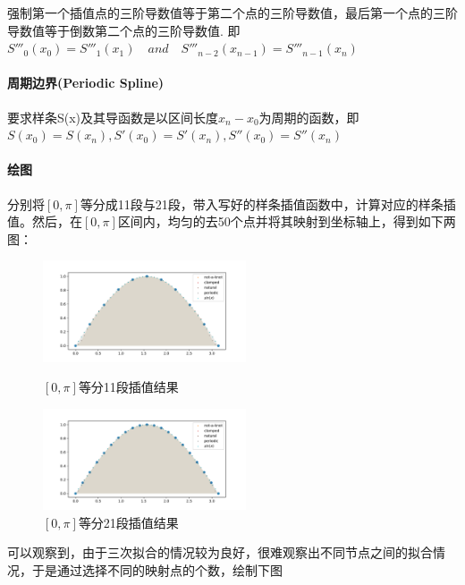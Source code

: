 强制第一个插值点的三阶导数值等于第二个点的三阶导数值，最后第一个点的三阶导数值等于倒数第二个点的三阶导数值. 即$S'''_0(x_0)=S'''_1(x_1) \quad and \quad S'''_{n-2}(x_{n-1})=S'''_{n-1}(x_n)$

\paragraph{周期边界(Periodic Spline)}

要求样条S(x)及其导函数是以区间长度$x_n-x_0$为周期的函数，即$S(x_0)=S(x_n),S'(x_0)=S'(x_n),S''(x_0)=S''(x_n)$

\paragraph{绘图}

分别将$[0,\pi]$等分成11段与21段，带入写好的样条插值函数中，计算对应的样条插值。然后，在$[0,\pi]$区间内，均匀的去50个点并将其映射到坐标轴上，得到如下两图：


\begin{figure}[H]
\centering
\begin{minipage}[t]{0.48\textwidth}
\centering
\includegraphics[width=6cm]{4-1.pdf}
\caption{$[0,\pi]$等分11段插值结果}
\end{minipage}
\begin{minipage}[t]{0.48\textwidth}
\centering
\includegraphics[width=6cm]{4-3.pdf}
\caption{$[0,\pi]$等分21段插值结果}
\end{minipage}
\end{figure}

可以观察到，由于三次拟合的情况较为良好，很难观察出不同节点之间的拟合情况，于是通过选择不同的映射点的个数，绘制下图

